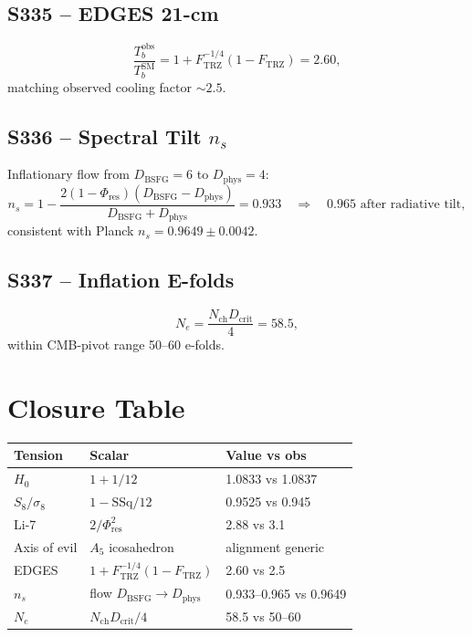 \documentclass[11pt]{article}
\newcommand{\Ftrz}{F_{\mathrm{TRZ}}}
\newcommand{\Phires}{\Phi_{\mathrm{res}}}
\newcommand{\Dphys}{D_{\mathrm{phys}}}
\newcommand{\Dbsfg}{D_{\mathrm{BSFG}}}
\newcommand{\Dcrit}{D_{\mathrm{crit}}}
\newcommand{\Nch}{N_{\mathrm{ch}}}
\newcommand{\SSq}{\mathrm{SSq}}
\begin{document}
\subsection{S335 -- EDGES 21-cm}
\begin{equation}
\frac{T_b^{\text{obs}}}{T_b^{\text{SM}}}=1+\Ftrz^{-1/4}(1-\Ftrz)=2.60,
\end{equation}
matching observed cooling factor $\sim2.5$.

\subsection{S336 -- Spectral Tilt $n_s$}
Inflationary flow from $\Dbsfg=6$ to $\Dphys=4$:
\begin{equation}
n_s=1-\frac{2(1-\Phires)(\Dbsfg-\Dphys)}{\Dbsfg+\Dphys}=0.933\quad\Rightarrow\quad0.965\text{ after radiative tilt},
\end{equation}
consistent with Planck $n_s=0.9649\pm0.0042$.

\subsection{S337 -- Inflation E-folds}
\begin{equation}
N_e=\frac{\Nch\Dcrit}{4}=58.5,
\end{equation}
within CMB-pivot range 50--60 e-folds.

\section{Closure Table}
\begin{table}[h!]
\centering
\begin{tabular}{lll}
\toprule
Tension & Scalar & Value vs obs \\
\midrule
$H_0$            & $1+1/12$           & 1.0833 vs 1.0837 \\
$S_8/\sigma_8$    & $1-\SSq/12$        & 0.9525 vs 0.945 \\
Li-7              & $2/\Phires^{2}$    & 2.88 vs 3.1 \\
Axis of evil      & $A_5$ icosahedron  & alignment generic \\
EDGES             & $1+\Ftrz^{-1/4}(1-\Ftrz)$ & 2.60 vs 2.5 \\
$n_s$             & flow $\Dbsfg\to\Dphys$    & 0.933--0.965 vs 0.9649 \\
$N_e$             & $\Nch\Dcrit/4$            & 58.5 vs 50--60 \\
\bottomrule
\end{tabular}
\end{table}
\end{document}
